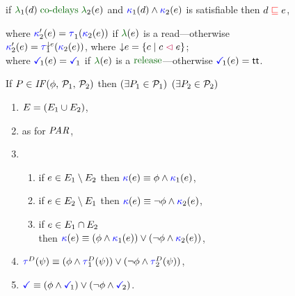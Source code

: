 \begin{figure}
\begin{multicols}{2}
\begin{enumerate}[topsep=0pt,label=(\textsc{s}\arabic*),ref=\textsc{s}\arabic*]
\begin{enumerate}[leftmargin=0pt]
        if $\labeling_1(\bEv)\rcodelays\labeling_2(\aEv)$
        and ${\color{blue}\kappa}_1(d) \land {\color{blue}\kappa}_2(e)$ is satisfiable
        then $d\mathrel{{\color{red}\sqsubseteq}}e$,
      \end{enumerate}
    \end{enumerate}
  \end{multicols}
  where
  $\labelingForm'_2(\aEv)=\aTr[1]{}{\labelingForm_2(\aEv})$ if $\labeling(\aEv)$ is a read---otherwise
  $\labelingForm'_2(\aEv)=\aTr[1]{\Cdown{\aEv}}{\labelingForm_2(\aEv})$, where
  $\smash{\downarrow}e=\{ c \mid c \mathrel{{\color{purple}\vartriangleleft}} e \}$;\\
  where
  $\aTerm[1](\aEv) = \aTerm[1]$ if $\labeling(\aEv)$ is a $\srelease$---otherwise
  $\aTerm[1](\aEv) = \TRUE$.
  \medskip

  \noindent
  If $\aPS \in \sIFTHEN{\aForm}{\aPSS_1}{\aPSS_2}$ then
  $(\exists P_1\in\mathcal{P}_1)$ $(\exists P_2\in\mathcal{P}_2)$
  \begin{multicols}{2}
    \begin{enumerate}[topsep=0pt,label=(\textsc{i}\arabic*),ref=\textsc{i}\arabic*]
    \item \label{if-E}
      $E = (E_1\cup E_2)$,
    \item \label{if-lambda}
       as for $\sLPAR{}{}$,
    \item[] \setcounter{enumi}{\value{kappa}} 
      \begin{enumerate}[leftmargin=0pt]
      \item \label{if-kappa1}
        if $e\in E_1\setminus E_2$ then ${\color{blue}\kappa}(e) \mathrel{\equiv} \phi\land{\color{blue}\kappa}_1(e)$,
      \item \label{if-kappa2}
        if $e\in E_2\setminus E_1$ then ${\color{blue}\kappa}(e) \mathrel{\equiv} \neg\phi\land{\color{blue}\kappa}_2(e)$, 
      \item \label{if-kappa12}
        if $e\in E_1\cap E_2$\\ then
        ${\color{blue}\kappa}(e) \mathrel{\equiv} (\phi\land{\color{blue}\kappa}_1(e))\lor(\neg\phi\land{\color{blue}\kappa}_2(e))$,
      \end{enumerate}
    \item \label{if-tau}
      $\aTr{\bEvs}{\bForm} \riff (\aForm\land\aTr[1]{\bEvs}{\bForm})\lor(\neg\aForm\land\aTr[2]{\bEvs}{\bForm})$,
    \item \label{if-term}
      $\aTerm \riff (\aForm\land\aTerm[1])\lor(\neg\aForm\land\aTerm[2])$.
    \end{enumerate}
  \end{multicols}
  \medskip


\end{figure}
